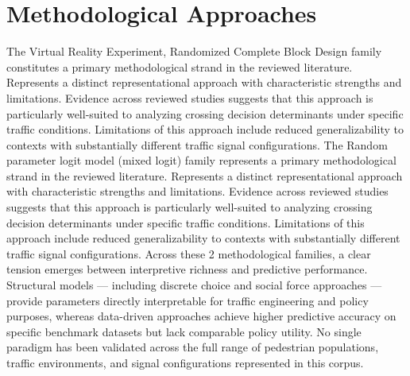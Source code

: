 \documentclass{article}
\begin{document}
\section{Methodological Approaches}
The Virtual Reality Experiment, Randomized Complete Block Design family constitutes a primary methodological strand in the reviewed literature. Represents a distinct representational approach with characteristic strengths and limitations. Evidence across reviewed studies suggests that this approach is particularly well-suited to analyzing crossing decision determinants under specific traffic conditions. Limitations of this approach include reduced generalizability to contexts with substantially different traffic signal configurations. The Random parameter logit model (mixed logit) family represents a primary methodological strand in the reviewed literature. Represents a distinct representational approach with characteristic strengths and limitations. Evidence across reviewed studies suggests that this approach is particularly well-suited to analyzing crossing decision determinants under specific traffic conditions. Limitations of this approach include reduced generalizability to contexts with substantially different traffic signal configurations. Across these 2 methodological families, a clear tension emerges between interpretive richness and predictive performance. Structural models — including discrete choice and social force approaches — provide parameters directly interpretable for traffic engineering and policy purposes, whereas data-driven approaches achieve higher predictive accuracy on specific benchmark datasets but lack comparable policy utility. No single paradigm has been validated across the full range of pedestrian populations, traffic environments, and signal configurations represented in this corpus.
\end{document}
